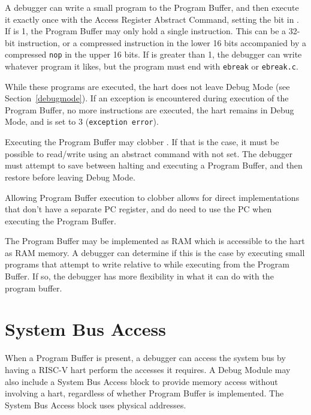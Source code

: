 A debugger can write a small program to the Program Buffer, and then
execute it exactly once with the Access Register Abstract Command,
setting the \Fpostexec bit in \Rcommand.
If \Fprogsize is 1, the Program Buffer may only hold a single instruction.
This can be a 32-bit
instruction, or a compressed instruction in the lower 16 bits accompanied by a
compressed {\tt nop} in the upper 16 bits.  If \Fprogsize is greater than 1,
the debugger can write whatever program it likes, but the program must end with
{\tt ebreak} or {\tt ebreak.c}.

While these programs are executed, the hart does not leave Debug Mode (see
Section~\ref{debugmode}).  If an exception is encountered during execution of
the Program Buffer, no more instructions are executed, the hart remains in Debug
Mode, and \Fcmderr is set to 3 ({\tt exception error}).

Executing the Program Buffer may clobber \Rdpc. If that is the case, it must be
possible to read/write \Rdpc using an abstract command with \Fpostexec not set.
The debugger must attempt to save \Rdpc between halting and
executing a Program Buffer, and then restore \Rdpc before leaving Debug Mode.

\begin{commentary}
    Allowing Program Buffer execution to clobber \Rdpc allows for direct
    implementations that don't have a separate PC register, and do need to use
    the PC when executing the Program Buffer.
\end{commentary}

The Program Buffer may be implemented as RAM which is accessible to the
hart as RAM memory. A debugger can determine if this is the case by executing small
programs that attempt to write relative to \Rpc while executing from the Program Buffer.
If so, the debugger has more flexibility in what it can do with the program buffer.

\section{System Bus Access} \label{systembusaccess}

When a Program Buffer is present, a debugger can access the system bus by having a
RISC-V hart perform the accesses it requires.
A Debug Module may also include a System Bus Access block to provide memory
access without
involving a hart, regardless of whether Program Buffer is implemented.
The System Bus Access block uses physical addresses.

